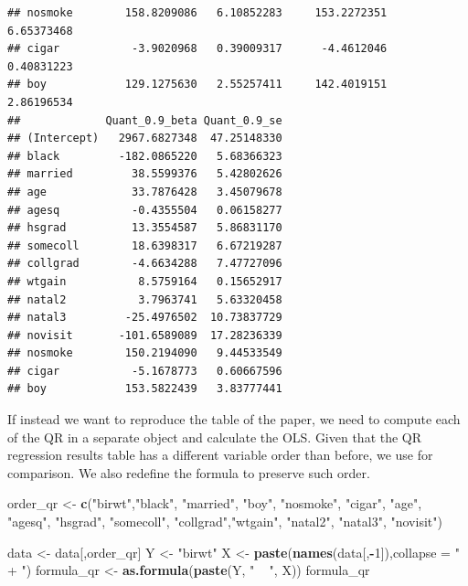 \documentclass[]{book}
\newenvironment{Shaded}{\begin{snugshade}}{\end{snugshade}}
\newcommand{\KeywordTok}[1]{\textcolor[rgb]{0.13,0.29,0.53}{\textbf{#1}}}
\newcommand{\DataTypeTok}[1]{\textcolor[rgb]{0.13,0.29,0.53}{#1}}
\newcommand{\DecValTok}[1]{\textcolor[rgb]{0.00,0.00,0.81}{#1}}
\newcommand{\StringTok}[1]{\textcolor[rgb]{0.31,0.60,0.02}{#1}}
\newcommand{\OperatorTok}[1]{\textcolor[rgb]{0.81,0.36,0.00}{\textbf{#1}}}
\newcommand{\NormalTok}[1]{#1}
\begin{document}
\begin{verbatim}
## nosmoke        158.8209086   6.10852283     153.2272351    6.65373468
## cigar           -3.9020968   0.39009317      -4.4612046    0.40831223
## boy            129.1275630   2.55257411     142.4019151    2.86196534
##             Quant_0.9_beta Quant_0.9_se
## (Intercept)   2967.6827348  47.25148330
## black         -182.0865220   5.68366323
## married         38.5599376   5.42802626
## age             33.7876428   3.45079678
## agesq           -0.4355504   0.06158277
## hsgrad          13.3554587   5.86831170
## somecoll        18.6398317   6.67219287
## collgrad        -4.6634288   7.47727096
## wtgain           8.5759164   0.15652917
## natal2           3.7963741   5.63320458
## natal3         -25.4976502  10.73837729
## novisit       -101.6589089  17.28236339
## nosmoke        150.2194090   9.44533549
## cigar           -5.1678773   0.60667596
## boy            153.5822439   3.83777441
\end{verbatim}

If instead we want to reproduce the table of the paper, we need to
compute each of the QR in a separate object and calculate the OLS. Given
that the QR regression results table has a different variable order than
before, we use for comparison. We also redefine the formula to preserve
such order.

\begin{Shaded}
\begin{Highlighting}[]
\NormalTok{order_qr <-}\StringTok{ }\KeywordTok{c}\NormalTok{(}\StringTok{"birwt"}\NormalTok{,}\StringTok{"black"}\NormalTok{, }\StringTok{"married"}\NormalTok{, }\StringTok{"boy"}\NormalTok{, }\StringTok{"nosmoke"}\NormalTok{, }\StringTok{"cigar"}\NormalTok{, }\StringTok{"age"}\NormalTok{, }\StringTok{"agesq"}\NormalTok{, }\StringTok{"hsgrad"}\NormalTok{, }\StringTok{"somecoll"}\NormalTok{, }\StringTok{"collgrad"}\NormalTok{,}\StringTok{"wtgain"}\NormalTok{, }\StringTok{"natal2"}\NormalTok{, }\StringTok{"natal3"}\NormalTok{, }\StringTok{"novisit"}\NormalTok{)}

\NormalTok{data <-}\StringTok{ }\NormalTok{data[,order_qr]}
\NormalTok{Y <-}\StringTok{ "birwt"}
\NormalTok{X <-}\StringTok{ }\KeywordTok{paste}\NormalTok{(}\KeywordTok{names}\NormalTok{(data[,}\OperatorTok{-}\DecValTok{1}\NormalTok{]),}\DataTypeTok{collapse =} \StringTok{" + "}\NormalTok{)}
\NormalTok{formula_qr <-}\StringTok{ }\KeywordTok{as.formula}\NormalTok{(}\KeywordTok{paste}\NormalTok{(Y, }\StringTok{" ~ "}\NormalTok{, X))}
\NormalTok{formula_qr}
\end{Highlighting}
\end{Shaded}
\end{document}
